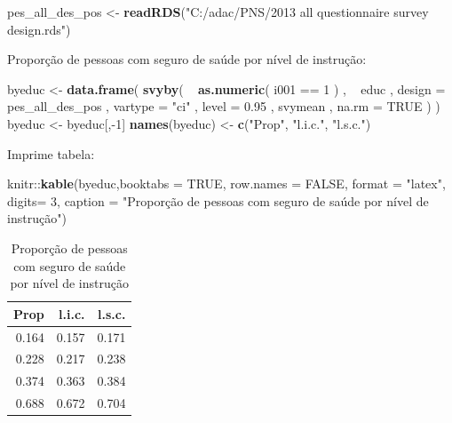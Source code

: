 \documentclass[]{book}
\newenvironment{Shaded}{\begin{snugshade}}{\end{snugshade}}
\newcommand{\KeywordTok}[1]{\textcolor[rgb]{0.13,0.29,0.53}{\textbf{{#1}}}}
\newcommand{\DataTypeTok}[1]{\textcolor[rgb]{0.13,0.29,0.53}{{#1}}}
\newcommand{\DecValTok}[1]{\textcolor[rgb]{0.00,0.00,0.81}{{#1}}}
\newcommand{\FloatTok}[1]{\textcolor[rgb]{0.00,0.00,0.81}{{#1}}}
\newcommand{\StringTok}[1]{\textcolor[rgb]{0.31,0.60,0.02}{{#1}}}
\newcommand{\OtherTok}[1]{\textcolor[rgb]{0.56,0.35,0.01}{{#1}}}
\newcommand{\NormalTok}[1]{{#1}}
\numberwithin{example}{chapter}
\numberwithin{remark}{chapter}
\numberwithin{definition}{chapter}
\begin{document}
\begin{Shaded}
\begin{Highlighting}[]
\NormalTok{pes_all_des_pos <-}\StringTok{ }\KeywordTok{readRDS}\NormalTok{(}\StringTok{"C:/adac/PNS/2013 all questionnaire survey design.rds"}\NormalTok{)}
\end{Highlighting}
\end{Shaded}

Proporção de pessoas com seguro de saúde por nível de instrução:

\begin{Shaded}
\begin{Highlighting}[]
\NormalTok{byeduc <-}\StringTok{ }\KeywordTok{data.frame}\NormalTok{( }\KeywordTok{svyby}\NormalTok{( ~}\StringTok{ }\KeywordTok{as.numeric}\NormalTok{( i001 ==}\StringTok{ }\DecValTok{1} \NormalTok{) , ~}\StringTok{ }\NormalTok{educ ,}
\DataTypeTok{design =} \NormalTok{pes_all_des_pos , }\DataTypeTok{vartype =} \StringTok{"ci"} \NormalTok{,  }\DataTypeTok{level =} \FloatTok{0.95} \NormalTok{,}
\NormalTok{svymean , }\DataTypeTok{na.rm =} \OtherTok{TRUE} \NormalTok{) )}
\NormalTok{byeduc <-}\StringTok{ }\NormalTok{byeduc[,-}\DecValTok{1}\NormalTok{]}
\KeywordTok{names}\NormalTok{(byeduc) <-}\StringTok{ }\KeywordTok{c}\NormalTok{(}\StringTok{"Prop"}\NormalTok{, }\StringTok{"l.i.c."}\NormalTok{, }\StringTok{"l.s.c."}\NormalTok{)}
\end{Highlighting}
\end{Shaded}

Imprime tabela:

\begin{Shaded}
\begin{Highlighting}[]
\NormalTok{knitr::}\KeywordTok{kable}\NormalTok{(byeduc,}\DataTypeTok{booktabs =} \OtherTok{TRUE}\NormalTok{, }\DataTypeTok{row.names =} \OtherTok{FALSE}\NormalTok{, }\DataTypeTok{format =} \StringTok{"latex"}\NormalTok{, }
\DataTypeTok{digits=} \DecValTok{3}\NormalTok{, }\DataTypeTok{caption =} \StringTok{"Proporção de pessoas com seguro de saúde por nível }
\StringTok{de instrução"}\NormalTok{)}
\end{Highlighting}
\end{Shaded}

\begin{table}

\caption{\label{tab:unnamed-chunk-50}Proporção de pessoas com seguro de saúde por nível 
de instrução}
\centering
\begin{tabular}[t]{rrr}
\toprule
Prop & l.i.c. & l.s.c.\\
\midrule
0.164 & 0.157 & 0.171\\
0.228 & 0.217 & 0.238\\
0.374 & 0.363 & 0.384\\
0.688 & 0.672 & 0.704\\
\bottomrule
\end{tabular}
\end{table}
\end{document}
